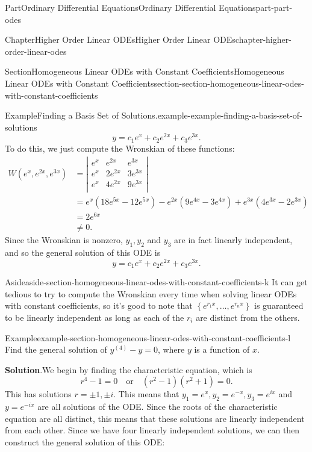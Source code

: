 \documentclass[twoside,10pt,]{book}
\newcommand{\blocktitlefont}{\relax}
\numberwithin{equation}{part}
\newcommand{\set}[1]{\left\{ #1 \right\}}
\newcommand{\amp}{&}
\begin{document}
\begin{partptx}{Part}{Ordinary Differential Equations}{}{Ordinary Differential Equations}{}{}{part-part-odes}
\begin{chapterptx}{Chapter}{Higher Order Linear ODEs}{}{Higher Order Linear ODEs}{}{}{chapter-higher-order-linear-odes}
\begin{sectionptx}{Section}{Homogeneous Linear ODEs with Constant Coefficients}{}{Homogeneous Linear ODEs with Constant Coefficients}{}{}{section-section-homogeneous-linear-odes-with-constant-coefficients}
\begin{example}{Example}{Finding a Basis Set of Solutions.}{example-example-finding-a-basis-set-of-solutions}
\begin{equation*}
y = c_{1}e^{x}+c_{2}e^{2x}+c_{3}e^{3x}.
\end{equation*}
To do this, we just compute the Wronskian of these functions:%
%
\begin{align*}
W(e^{x},e^{2x},e^{3x})
\amp= \left|
\begin{array}{ccc}
e^{x} \amp e^{2x}  \amp e^{3x}  \\
e^{x} \amp 2e^{2x} \amp 3e^{3x} \\
e^{x} \amp 4e^{2x} \amp 9e^{3x} \\
\end{array}
\right|\\
\amp= e^{x}(18e^{5x}-12e^{5x})-e^{2x}(9e^{4x}-3e^{4x})+e^{3x}(4e^{3x}-2e^{3x})\\
\amp= 2e^{6x}\\
\amp\neq0.
\end{align*}
Since the Wronskian is nonzero, \(y_{1},y_{2}\) and \(y_{3}\) are in fact linearly independent, and so the general solution of this ODE is%
\begin{equation*}
y = c_{1}e^{x}+c_{2}e^{2x}+c_{3}e^{3x}.
\end{equation*}
%
\end{example}
\begin{aside}{Aside}{}{aside-section-homogeneous-linear-odes-with-constant-coefficients-k}%
It can get tedious to try to compute the Wronskian every time when solving linear ODEs with constant coefficients, so it's good to note that \(\set{e^{r_{1}x},\dots,e^{r_{n}x}}\) is guaranteed to be linearly independent as long as each of the \(r_{i}\) are distinct from the others.%
\end{aside}
\begin{example}{Example}{}{example-section-homogeneous-linear-odes-with-constant-coefficients-l}%
Find the general solution of \(y^{(4)}-y=0\), where \(y\) is a function of \(x\).%
\par\smallskip%
\noindent\textbf{\blocktitlefont Solution}.\hypertarget{solution-section-homogeneous-linear-odes-with-constant-coefficients-l-b}{}\quad{}We begin by finding the characteristic equation, which is%
\begin{equation*}
r^{4}-1=0\quad\text{or}\quad (r^{2}-1)(r^{2}+1)=0.
\end{equation*}
This has solutions \(r=\pm1,\pm i\). This means that \(y_{1} = e^{x},y_{2}=e^{-x},y_{3}=e^{ix}\) and \(y=e^{-ix}\) are all solutions of the ODE. Since the roots of the characteristic equation are all distinct, this means that these solutions are linearly independent from each other. Since we have four linearly independent solutions, we can then construct the general solution of this ODE:%

\end{example}
\end{sectionptx}
\end{chapterptx}
\end{partptx}
\end{document}
